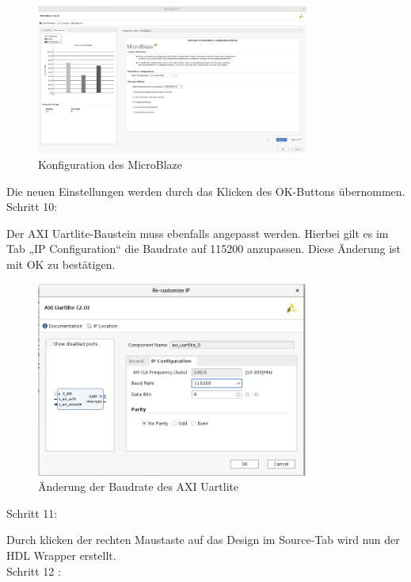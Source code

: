 \begin{figure}[H]
\centering
\includegraphics[width=0.8\textwidth]{Hauptteil/Schritt9.png}
\caption{Konfiguration des MicroBlaze}
\label{fig:mbschritt9}
\end{figure}

Die neuen Einstellungen werden durch das Klicken des OK-Buttons übernommen.\\

Schritt 10:

Der AXI Uartlite-Baustein muss ebenfalls angepasst werden. Hierbei gilt es im Tab „IP Configuration“ die Baudrate auf 115200 anzupassen.
Diese Änderung ist mit OK zu bestätigen.

\begin{figure}[H]
\centering
\includegraphics[width=0.8\textwidth]{Hauptteil/Schritt10.png}
\caption{Änderung der Baudrate des AXI Uartlite}
\label{fig:mbschritt10}
\end{figure}

Schritt 11:

Durch klicken der rechten Maustaste auf das Design im Source-Tab wird nun der HDL Wrapper erstellt.\\

Schritt 12 :

